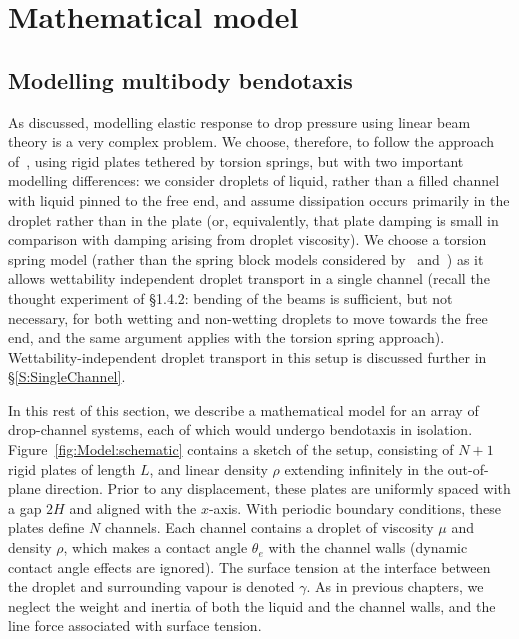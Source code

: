 \section{Mathematical model}\label{S:Model}
\subsection{Modelling multibody bendotaxis}
As discussed, modelling elastic response to drop pressure using linear beam theory is a very complex problem. We choose, therefore, to follow the approach of~\cite{Wei2014EPL}, using rigid plates tethered by torsion springs, but with two important modelling differences: we consider droplets of liquid, rather than a filled channel with liquid pinned to the free end, and assume dissipation occurs primarily in the droplet rather than in the plate (or, equivalently, that plate damping is small in comparison with damping arising from droplet viscosity). We choose a torsion spring model (rather than the spring block models considered by~\cite{Gat2013JFM} and~\cite{ Singh2014JFM}) as it allows wettability independent droplet transport in a single channel (recall the thought experiment of \S1.4.2: bending of the beams is sufficient, but not necessary, for both wetting and non-wetting droplets to move towards the free end, and the same argument applies with the torsion spring approach).  Wettability-independent droplet transport in this setup is discussed further in \S\ref{S:SingleChannel}.

In this rest of this section, we describe a mathematical model for an array of drop-channel systems, each of which would undergo bendotaxis in isolation. Figure~\ref{fig:Model:schematic} contains a sketch of the setup, consisting of $N+1$ rigid plates of length $L$, and linear density $\rho$ extending infinitely in the out-of-plane direction. Prior to any displacement, these plates are uniformly spaced with a gap $2H$ and aligned with the $x$-axis. With periodic boundary conditions, these plates define $N$ channels. Each channel contains a droplet of viscosity $\mu$ and density $\rho$, which makes a contact angle $\theta_{e}$ with the channel walls (dynamic contact angle effects are ignored). The surface tension at the interface between the droplet and surrounding vapour is denoted $\gamma$. As in previous chapters, we neglect the weight and inertia of both the liquid and the channel walls, and the line force associated with surface tension.



